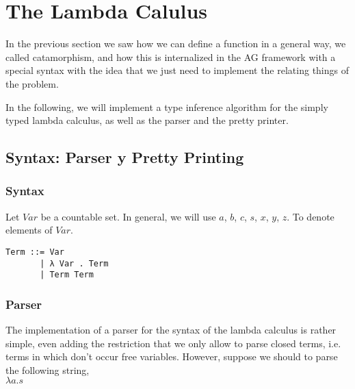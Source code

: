 \documentclass[a4paper,10pt]{article}
\begin{document}

\section{The Lambda Calulus}

In the previous section we saw how we can define a function in a general way, we called
catamorphism, and how this is internalized in the AG framework with a special syntax
with the idea that we just need to implement the relating things of the problem.

In the following, we will implement a type inference algorithm for the simply typed lambda
calculus, as well as the parser and the pretty printer.

\subsection{Syntax: Parser y Pretty Printing}

\subsubsection{Syntax}

Let $Var$ be a countable set. In general, we will use $a$, $b$, $c$, $s$, $x$, $y$, $z$. To
denote elements of $Var$.

\begin{lstlisting}
Term ::= Var
       | λ Var . Term
       | Term Term
\end{lstlisting}

\subsubsection{Parser}

The implementation of a parser for the syntax of the lambda calculus is rather simple,
even adding the restriction that we only allow to parse closed terms, i.e. terms in which
don't occur free variables. However, suppose we should to parse the following string,\\

$\lambda a . s$\\
\end{document}
